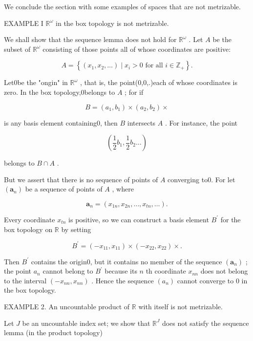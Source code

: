 We conclude the section with some examples of spaces that are not metrizable.

EXAMPLE I \({\mathbb{R}}^{\omega }\) in the box topology is not metrizable.

We shall show that the sequence lemma does not hold for \({\mathbb{R}}^{\omega }\) . Let \(A\) be the subset of \({\mathbb{R}}^{\omega }\) consisting of those points all of whose coordinates are positive:

\[
A = \left\{  {\left( {{x}_{1},{x}_{2},\ldots }\right)  \mid  {x}_{i} > 0\text{ for all }i \in  {\mathbb{Z}}_{ + }}\right\}  .
\]

Let0be the "ongin" in \({\mathbb{R}}^{\omega }\) , that is, the point(0,0,.)each of whose coordinates is zero. In the box topology,0belongs to \(A\) ; for if

\[
B = \left( {{a}_{1},{b}_{1}}\right)  \times  \left( {{a}_{2},{b}_{2}}\right)  \times
\]

is any basis element containing0, then \(B\) intersects \(A\) . For instance, the point

\[
\left( {\frac{1}{2}{b}_{1},\frac{1}{2}{b}_{2}\ldots }\right)
\]

belongs to \(B \cap  A\) .

But we assert that there is no sequence of points of \(A\) converging to0. For let \(\left( {\mathbf{a}}_{n}\right)\) be a sequence of points of \(A\) , where

\[
{\mathbf{a}}_{n} = \left( {{x}_{1n},{x}_{2n},\ldots ,{x}_{tn},\ldots }\right) .
\]

Every coordinate \({x}_{tn}\) is positive, so we can construct a basis element \({B}^{\prime }\) for the box topology on \(\mathbb{R}\) by setting

\[
{B}^{\prime } = \left( {-{x}_{11},{x}_{11}}\right)  \times  \left( {-{x}_{22},{x}_{22}}\right)  \times  .
\]

Then \({B}^{\prime }\) contains the origin0, but it contains no member of the sequence \(\left( {\mathbf{a}}_{n}\right)\) ; the point \({a}_{n}\) cannot belong to \({B}^{\prime }\) because its \(n\) th coordinate \({x}_{nn}\) does not belong to the interval \(\left( {-{x}_{nn},{x}_{nn}}\right)\) . Hence the sequence \(\left( {a}_{n}\right)\) cannot converge to 0 in the box topology.

EXAMPLE 2. An uncountable product of \(\mathbb{R}\) with itself is not metrizable.

Let \(J\) be an uncountable index set; we show that \({\mathbb{R}}^{J}\) does not satisfy the sequence lemma (in the product topology)

